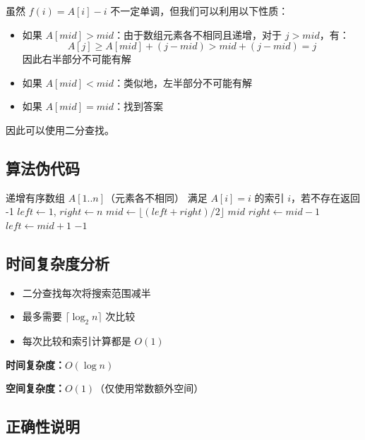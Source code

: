 \documentclass[UTF8,12pt,a4paper]{ctexart}
\begin{document}
虽然 $f(i) = A[i] - i$ 不一定单调，但我们可以利用以下性质：
\begin{itemize}
	\item 如果 $A[mid] > mid$：由于数组元素各不相同且递增，对于 $j > mid$，有：
	$$A[j] \geq A[mid] + (j - mid) > mid + (j - mid) = j$$
	因此右半部分不可能有解
	
	\item 如果 $A[mid] < mid$：类似地，左半部分不可能有解
	
	\item 如果 $A[mid] = mid$：找到答案
\end{itemize}

因此可以使用二分查找。

\subsection*{算法伪代码}

\begin{algorithm}[H]
	\caption{查找固定点 $A[i] = i$}
	\begin{algorithmic}[1]
		\Require 递增有序数组 $A[1..n]$（元素各不相同）
		\Ensure 满足 $A[i] = i$ 的索引 $i$，若不存在返回 -1
		\State $left \gets 1$, $right \gets n$
			\State $mid \gets \lfloor (left + right) / 2 \rfloor$
				\State \Return $mid$ 
				\State $right \gets mid - 1$ 
			\Else {}
				\State $left \gets mid + 1$ 
			\EndIf
		\EndWhile
		\State \Return $-1$ 
	\end{algorithmic}
\end{algorithm}

\subsection*{时间复杂度分析}

\begin{itemize}
	\item 二分查找每次将搜索范围减半
	\item 最多需要 $\lceil \log_2 n \rceil$ 次比较
	\item 每次比较和索引计算都是 $O(1)$
\end{itemize}

\textbf{时间复杂度：}$O(\log n)$

\textbf{空间复杂度：}$O(1)$（仅使用常数额外空间）

\subsection*{正确性说明}
\end{document}
